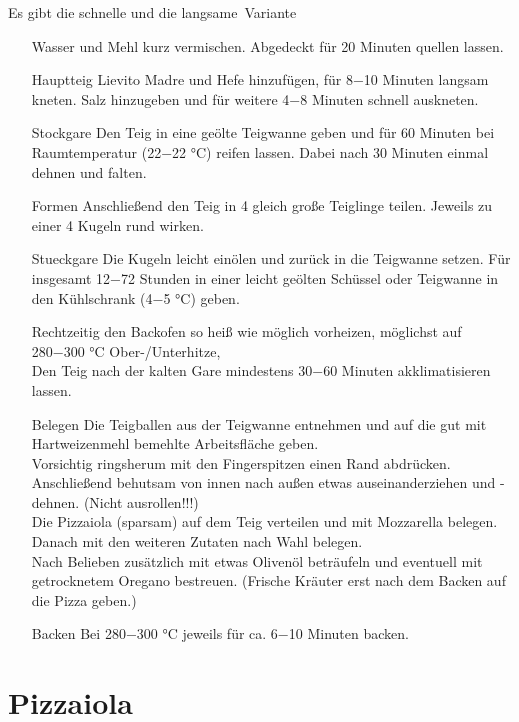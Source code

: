 Es gibt die schnelle und die \glqq langsame\grqq\ Variante
\begin{enumerate}
    \item [\GLS{Autolyse}] Wasser und Mehl kurz vermischen. Abgedeckt für 20 Minuten quellen lassen.
    
    \item [\Gls{Hauptteig}] Lievito Madre und Hefe hinzufügen, für 8−10 Minuten langsam kneten. Salz hinzugeben und für weitere 4−8 Minuten schnell auskneten.
    \item [\Gls{Stockgare}] Den Teig in eine geölte Teigwanne geben und für 60 Minuten bei Raumtemperatur (22−22 °C) reifen lassen.
    Dabei nach 30 Minuten einmal dehnen und falten.
    \item [\Gls{Formen}]  Anschließend den Teig in 4 gleich große Teiglinge teilen. Jeweils zu einer 4 Kugeln rund wirken.
    \item [\Gls{Stueckgare}]  Die Kugeln leicht einölen und zurück in die Teigwanne setzen. Für insgesamt 12−72 Stunden in einer leicht geölten Schüssel oder Teigwanne in den Kühlschrank (4−5 °C) geben.
    \item [\GLS{Akklimatisieren}] Rechtzeitig den Backofen so heiß wie möglich vorheizen, möglichst auf 280−300 °C Ober-/Unterhitze,\\
    Den Teig nach der kalten Gare mindestens 30−60 Minuten akklimatisieren lassen.
    \item[Belegen] 
    Die Teigballen aus der Teigwanne entnehmen und auf die gut mit Hartweizenmehl bemehlte Arbeitsfläche geben.\\
    Vorsichtig ringsherum mit den Fingerspitzen einen Rand abdrücken.
    Anschließend behutsam von innen nach außen etwas auseinanderziehen und -dehnen. (Nicht ausrollen!!!)\\
    Die Pizzaiola (sparsam) auf dem Teig verteilen und mit Mozzarella belegen.\\
    Danach mit den weiteren Zutaten nach Wahl belegen.\\
    Nach Belieben zusätzlich mit etwas Olivenöl beträufeln und eventuell mit getrocknetem Oregano bestreuen. (Frische Kräuter erst nach dem Backen auf die Pizza geben.)
    \item [\Gls{Backen}] Bei 280−300 °C jeweils für ca. 6−10 Minuten backen. 
\end{enumerate}
%

\section{Pizzaiola}
